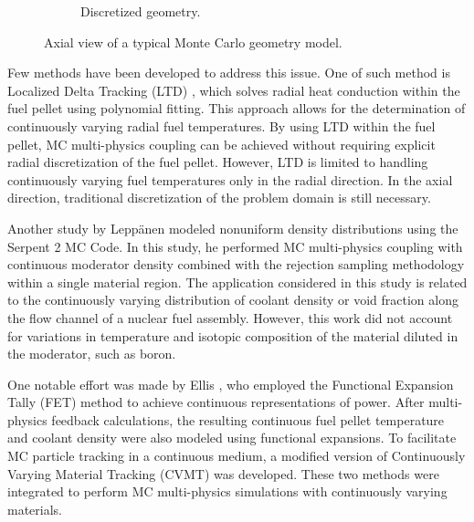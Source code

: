 \begin{figure}
\begin{subfigure}[b]{0.25\textwidth}
        \caption{Discretized geometry.}
        \label{fig_1b}
    \end{subfigure}
    \caption{Axial view of a typical Monte Carlo geometry model.}
       \label{fig_1}
\end{figure}

Few methods have been developed to address this issue. One of such method is Localized Delta Tracking (LTD) \cite{nchoi_2020}, which solves radial heat conduction within the fuel pellet using polynomial fitting. This approach allows for the determination of continuously varying radial fuel temperatures. By using LTD within the fuel pellet, MC multi-physics coupling can be achieved without requiring explicit radial discretization of the fuel pellet. However, LTD is limited to handling continuously varying fuel temperatures only in the radial direction. In the axial direction, traditional discretization of the problem domain is still necessary.

Another study by Leppänen \cite{leppanen_2013} modeled nonuniform density distributions using the Serpent 2 MC Code. In this study, he performed MC multi-physics coupling with continuous moderator density combined with the rejection sampling methodology within a single material region. The application considered in this study is related to the continuously varying distribution of coolant density or void fraction along the flow channel of a nuclear fuel assembly. However, this work did not account for variations in temperature and isotopic composition of the material diluted in the moderator, such as boron.

One notable effort was made by Ellis \cite{ellis}, who employed the Functional Expansion Tally (FET) method \cite{chadsey,gries} to achieve continuous representations of power. After multi-physics feedback calculations, the resulting continuous fuel pellet temperature and coolant density were also modeled using functional expansions. To facilitate MC particle tracking in a continuous medium, a modified version of Continuously Varying Material Tracking (CVMT) \cite{brown} was developed. These two methods were integrated to perform MC multi-physics simulations with continuously varying materials.

